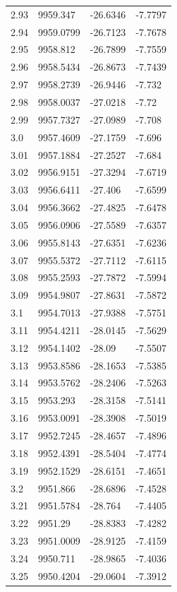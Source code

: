 \begin{table}[H]
\begin{tabular}{llll}
2.93 & 9959.347 & -26.6346 & -7.7797 \\
2.94 & 9959.0799 & -26.7123 & -7.7678 \\
2.95 & 9958.812 & -26.7899 & -7.7559 \\
2.96 & 9958.5434 & -26.8673 & -7.7439 \\
2.97 & 9958.2739 & -26.9446 & -7.732 \\
2.98 & 9958.0037 & -27.0218 & -7.72 \\
2.99 & 9957.7327 & -27.0989 & -7.708 \\
3.0 & 9957.4609 & -27.1759 & -7.696 \\
3.01 & 9957.1884 & -27.2527 & -7.684 \\
3.02 & 9956.9151 & -27.3294 & -7.6719 \\
3.03 & 9956.6411 & -27.406 & -7.6599 \\
3.04 & 9956.3662 & -27.4825 & -7.6478 \\
3.05 & 9956.0906 & -27.5589 & -7.6357 \\
3.06 & 9955.8143 & -27.6351 & -7.6236 \\
3.07 & 9955.5372 & -27.7112 & -7.6115 \\
3.08 & 9955.2593 & -27.7872 & -7.5994 \\
3.09 & 9954.9807 & -27.8631 & -7.5872 \\
3.1 & 9954.7013 & -27.9388 & -7.5751 \\
3.11 & 9954.4211 & -28.0145 & -7.5629 \\
3.12 & 9954.1402 & -28.09 & -7.5507 \\
3.13 & 9953.8586 & -28.1653 & -7.5385 \\
3.14 & 9953.5762 & -28.2406 & -7.5263 \\
3.15 & 9953.293 & -28.3158 & -7.5141 \\
3.16 & 9953.0091 & -28.3908 & -7.5019 \\
3.17 & 9952.7245 & -28.4657 & -7.4896 \\
3.18 & 9952.4391 & -28.5404 & -7.4774 \\
3.19 & 9952.1529 & -28.6151 & -7.4651 \\
3.2 & 9951.866 & -28.6896 & -7.4528 \\
3.21 & 9951.5784 & -28.764 & -7.4405 \\
3.22 & 9951.29 & -28.8383 & -7.4282 \\
3.23 & 9951.0009 & -28.9125 & -7.4159 \\
3.24 & 9950.711 & -28.9865 & -7.4036 \\
3.25 & 9950.4204 & -29.0604 & -7.3912 \\

\end{tabular}
\end{table}
